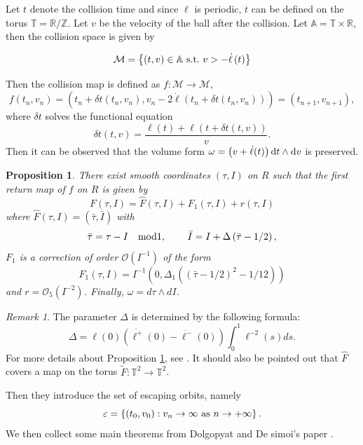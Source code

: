 \documentclass{article}
\numberwithin{figure}{section}
\numberwithin{equation}{section}
\newtheorem{proposition}[lemma]{Proposition}
\theoremstyle{remark}
\newtheorem*{remark}{Remark}
\theoremstyle{definition}
\begin{document}
Let $t$ denote the collision time and since $\ell$ is periodic, $t$ can be defined on the torus $\mathbb{T}=\mathbb{R}/\mathbb{ Z}$. Let $v$ be the velocity of the ball after the collision. Let $\mathbb{A}=\mathbb{T} \times \mathbb{R}$, then the collision space is given by

$$\mathcal{M}=\left\{\left(t,v\right)\in\mathbb{A} \ {\rm s.t.} \ v>-\dot{\ell}\left(t\right)\right\}$$

Then the collision map is defined as $f:\mathcal{M} \rightarrow \mathcal{M},$
$$f\left(t_n,v_n\right)=\left(t_n+\delta t\left(t_n,v_n\right),v_n-2\dot{\ell}\left(t_n+\delta t\left(t_n,v_n\right)\right)\right)=\left(t_{n+1},v_{n+1}\right),$$
where $\delta t$ solves the functional equation
$$\delta t\left(t,v\right)=\frac{\ell(t)+\ell(t+\delta t(t,v))}{v}.$$
Then it can be observed that the volume form $\omega=\left(v+\dot{\ell}(t)\right){\rm d}t\wedge {\rm d}v$ is preserved.

\begin{proposition}\label{cite}
	There exist smooth coordinates $\left(\tau,I\right)$ on $R$ such that the first return map of $f$ on $R$ is given by
	$$F\left(\tau,I\right)=\hat{F}\left(\tau,I\right)+F_1\left(\tau,I\right)+r\left(\tau,I\right)$$
	where $\hat{F}\left(\tau,I\right)=\left(\bar{\tau},\bar{I}\right)$ with
	\begin{align*}
		\bar{\tau}=\tau-I \ \ \ {\rm mod 1,} \ \ \ \ \ \ \ \bar{I}=I+\Delta\left(\bar{\tau}-1/2\right),  
	\end{align*}
   $F_1$ is a correction of order $\mathcal{O}\left(I^{-1}\right)$ of the form 
   $$F_1\left(\tau,I\right)=I^{-1}\left(0,\Delta_1\left(\left(\bar{\tau}-1/2\right)^2-1/12\right)\right)$$
   and $r=\mathcal{O}_5\left(I^{-2}\right)$. Finally, $\omega=d\tau \wedge dI$.
\end{proposition} 

\begin{remark}
	The parameter $\Delta$ is determined by the following formula:
	$$\Delta=\ell(0)\left(\dot{\ell^+}(0)-\dot{\ell^-}(0)\right)\int_{0}^{1}\ell^{-2}(s)ds.$$ 
	For more details about Proposition \ref{cite}, see \cite{de2012dynamics}.
	It should also be pointed out that $\hat{F}$ covers a map on the torus $\tilde{F}:\mathbb{T}^2\rightarrow\mathbb{T}^2$. 
\end{remark}

Then they introduce the set of escaping orbits, namely
$$\varepsilon=\left\{\left(t_0,v_0\right):v_n\rightarrow\infty \ {\rm as}\ n\rightarrow +\infty\right\}.$$
We then collect some main theorems from Dolgopyat and De simoi's paper \cite{de_Simoi_2012}.
\end{document}

